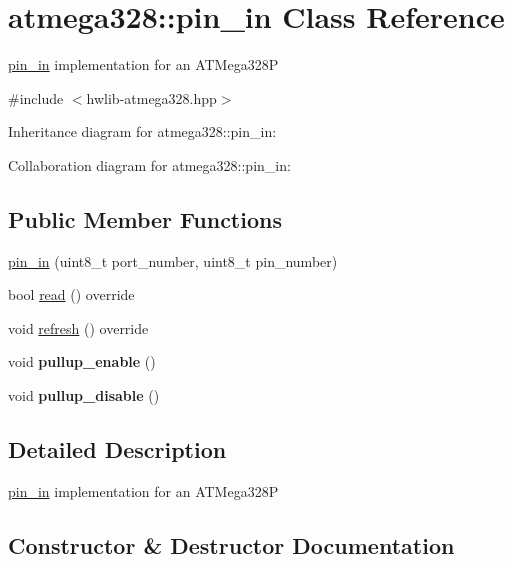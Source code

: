 \hypertarget{classatmega328_1_1pin__in}{}\section{atmega328\+:\+:pin\+\_\+in Class Reference}
\label{classatmega328_1_1pin__in}


\hyperlink{classatmega328_1_1pin__in}{pin\+\_\+in} implementation for an A\+T\+Mega328P  




{\ttfamily \#include $<$hwlib-\/atmega328.\+hpp$>$}



Inheritance diagram for atmega328\+:\+:pin\+\_\+in\+:


Collaboration diagram for atmega328\+:\+:pin\+\_\+in\+:
\subsection*{Public Member Functions}
\begin{DoxyCompactItemize}
\item 
\hyperlink{classatmega328_1_1pin__in_a212d67988ac71e08199e311e721ec739}{pin\+\_\+in} (uint8\+\_\+t port\+\_\+number, uint8\+\_\+t pin\+\_\+number)
\item 
bool \hyperlink{classatmega328_1_1pin__in_a77953ce4da1daee0511822ebae5f80e9}{read} () override
\item 
void \hyperlink{classatmega328_1_1pin__in_a5582f55d2e2d857e941002a7c16cea8f}{refresh} () override
\item 
\mbox{\label{classatmega328_1_1pin__in_aade77154a811bf4d05a461a435cebe03}} 
void {\bfseries pullup\+\_\+enable} ()
\item 
\mbox{\label{classatmega328_1_1pin__in_ab9708e4473478e726c2cccc0a8ef1203}} 
void {\bfseries pullup\+\_\+disable} ()
\end{DoxyCompactItemize}


\subsection{Detailed Description}
\hyperlink{classatmega328_1_1pin__in}{pin\+\_\+in} implementation for an A\+T\+Mega328P 

\subsection{Constructor \& Destructor Documentation}
\mbox{\label{classatmega328_1_1pin__in_a212d67988ac71e08199e311e721ec739}} 
